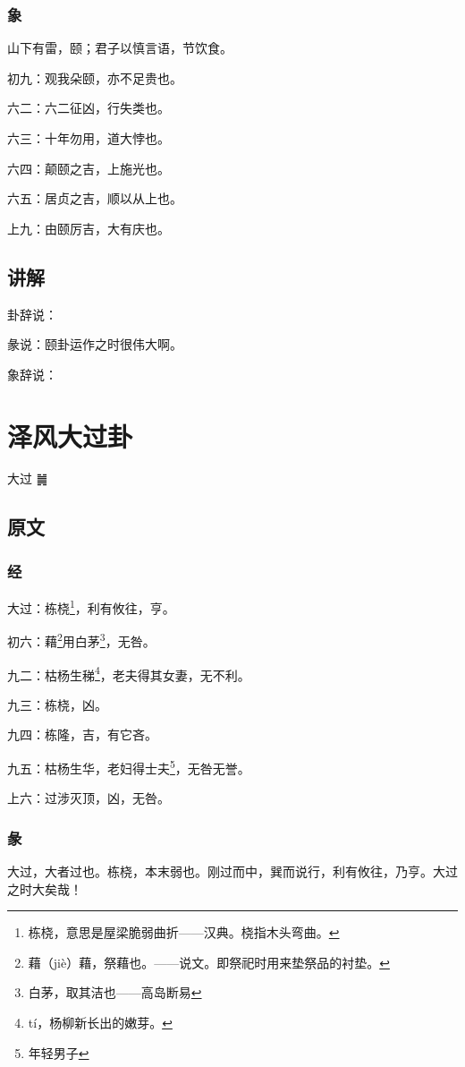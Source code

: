 \documentclass[12pt,oneside]{book}
\begin{document}
\subsection{象}
山下有雷，颐；君子以慎言语，节饮食。

初九：观我朵颐，亦不足贵也。

六二：六二征凶，行失类也。

六三：十年勿用，道大悖也。

六四：颠颐之吉，上施光也。

六五：居贞之吉，顺以从上也。

上九：由颐厉吉，大有庆也。

\section{讲解}
卦辞说：

彖说：颐卦运作之时很伟大啊。

象辞说：


\chapter{泽风大过卦}
大过 {\Large ䷛}

\section{原文}

\subsection{经}
大过：栋桡\footnote{栋桡，意思是屋梁脆弱曲折——汉典。桡指木头弯曲。}，利有攸往，亨。

初六：藉\footnote{藉（jiè）藉，祭藉也。——说文。即祭祀时用来垫祭品的衬垫。}用白茅\footnote{白茅，取其洁也——高岛断易}，无咎。

九二：枯杨生稊\footnote{tí，杨柳新长出的嫩芽。}，老夫得其女妻，无不利。

九三：栋桡，凶。

九四：栋隆，吉，有它吝。

九五：枯杨生华，老妇得士夫\footnote{年轻男子}，无咎无誉。

上六：过涉灭顶，凶，无咎。

\subsection{彖}
大过，大者过也。栋桡，本末弱也。刚过而中，巽而说行，利有攸往，乃亨。大过之时大矣哉！
\end{document}
